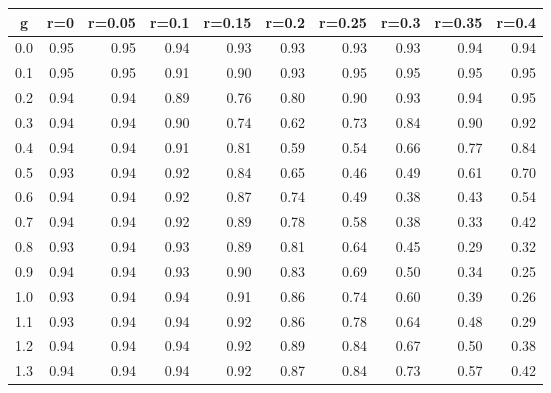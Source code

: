 %
\begin{table}[!tbp]
 \begin{center}
 \begin{tabular}{rrrrrrrrrr}\hline\hline
\multicolumn{1}{c}{g}&\multicolumn{1}{c}{r=0}&\multicolumn{1}{c}{r=0.05}&\multicolumn{1}{c}{r=0.1}&\multicolumn{1}{c}{r=0.15}&\multicolumn{1}{c}{r=0.2}&\multicolumn{1}{c}{r=0.25}&\multicolumn{1}{c}{r=0.3}&\multicolumn{1}{c}{r=0.35}&\multicolumn{1}{c}{r=0.4}\tabularnewline
\hline
0.0&0.95&0.95&0.94&0.93&0.93&0.93&0.93&0.94&0.94\tabularnewline
0.1&0.95&0.95&0.91&0.90&0.93&0.95&0.95&0.95&0.95\tabularnewline
0.2&0.94&0.94&0.89&0.76&0.80&0.90&0.93&0.94&0.95\tabularnewline
0.3&0.94&0.94&0.90&0.74&0.62&0.73&0.84&0.90&0.92\tabularnewline
0.4&0.94&0.94&0.91&0.81&0.59&0.54&0.66&0.77&0.84\tabularnewline
0.5&0.93&0.94&0.92&0.84&0.65&0.46&0.49&0.61&0.70\tabularnewline
0.6&0.94&0.94&0.92&0.87&0.74&0.49&0.38&0.43&0.54\tabularnewline
0.7&0.94&0.94&0.92&0.89&0.78&0.58&0.38&0.33&0.42\tabularnewline
0.8&0.93&0.94&0.93&0.89&0.81&0.64&0.45&0.29&0.32\tabularnewline
0.9&0.94&0.94&0.93&0.90&0.83&0.69&0.50&0.34&0.25\tabularnewline
1.0&0.93&0.94&0.94&0.91&0.86&0.74&0.60&0.39&0.26\tabularnewline
1.1&0.93&0.94&0.94&0.92&0.86&0.78&0.64&0.48&0.29\tabularnewline
1.2&0.94&0.94&0.94&0.92&0.89&0.84&0.67&0.50&0.38\tabularnewline
1.3&0.94&0.94&0.94&0.92&0.87&0.84&0.73&0.57&0.42\tabularnewline
\hline
\end{tabular}

\end{center}

\end{table}

